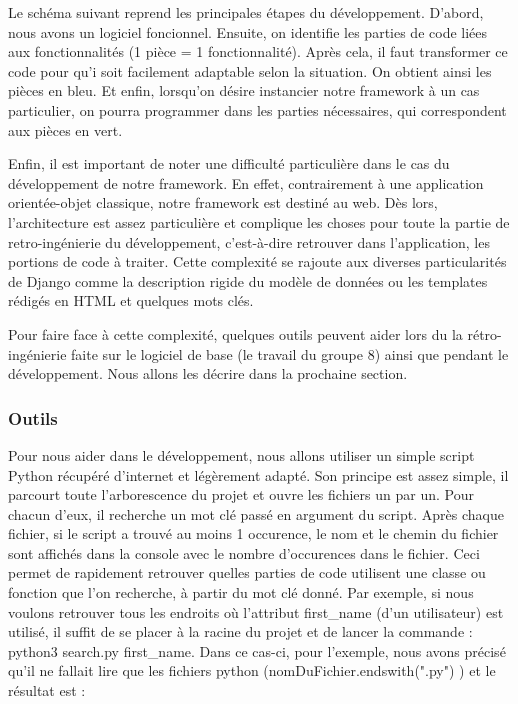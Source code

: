 Le schéma suivant reprend les principales étapes du développement.  D'abord,  nous avons un logiciel foncionnel.  Ensuite,  on identifie les parties de code liées aux fonctionnalités (1 pièce = 1 fonctionnalité).  Après cela,  il faut transformer ce code pour qu'i soit facilement adaptable selon la situation.  On obtient ainsi les pièces en bleu.  Et enfin,  lorsqu'on désire instancier notre framework à un cas particulier,  on pourra programmer dans les parties nécessaires,  qui correspondent aux pièces en vert.

\begin{center}
\end{center}

Enfin,  il est important de noter une difficulté particulière dans le cas du développement de notre framework.  En effet,  contrairement à une application orientée-objet classique,  notre framework est destiné au web.  Dès lors,  l'architecture est assez particulière et complique les choses pour toute la partie de retro-ingénierie du développement,  c'est-à-dire retrouver dans l'application,  les portions de code à traiter.  Cette complexité se rajoute aux diverses particularités de Django comme la description rigide du modèle de données ou les templates rédigés en HTML et quelques mots clés.

Pour faire face à cette complexité,  quelques outils peuvent aider lors du la rétro-ingénierie faite sur le logiciel de base (le travail du groupe 8) ainsi que pendant le développement.  Nous allons les décrire dans la prochaine section.

\subsubsection{Outils}

Pour nous aider dans le développement,  nous allons utiliser un simple script Python récupéré d'internet et légèrement adapté.  Son principe est assez simple,  il parcourt toute l'arborescence du projet et ouvre les fichiers un par un.  Pour chacun d'eux,  il recherche un mot clé passé en argument du script.  Après chaque fichier,  si le script a trouvé au moins 1 occurence,  le nom et le chemin du fichier sont affichés dans la console avec le nombre d'occurences dans le fichier.  Ceci permet de rapidement retrouver quelles parties de code utilisent une classe ou fonction que l'on recherche,  à partir du mot clé donné.  Par exemple,  si nous voulons retrouver tous les endroits où l'attribut first\_name (d'un utilisateur) est utilisé,  il suffit de se placer à la racine du projet et de lancer la commande : python3 search.py first\_name.  Dans ce cas-ci,  pour l'exemple,  nous avons précisé qu'il ne fallait lire que les fichiers python (nomDuFichier.endswith(".py") ) et le résultat est : 


